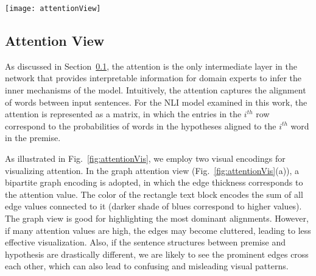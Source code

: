 \begin{figure*}[htbp]
\centering
\vspace{-2mm}
\texttt{[image: attentionView]}
\vspace{-6mm}
\caption{
Attention visualization. In the graph attention view (a), a bipartite graph encoding is adopted, in which the edge thickness corresponds to the attention value. In the matrix attention view (b), the entries of $i^{th}$ row represent the probabilities of words in hypotheses align to the $i^{th}$ word in the premise.
The user can alter the attention values via the pop-up interface illustrated in (c).
We overlay the dependency tree ($a_1$) grammar structure to highlight important words and simplify complex sentence to reduce clutter (d-e).
In (f), we show the difference between two attention matrix (the comparison feature is controlled by the buttons in the top left of all attention plots ($a_2$) ).
}
\label{fig:attentionVis}
\end{figure*}

\subsection{Attention View}
\label{sec:attention}
As discussed in Section~\ref{sec:attention}, the attention is the only intermediate layer in the network that provides interpretable information for domain experts to infer the inner mechanisms of the model.
%
Intuitively, the attention captures the alignment of words between input sentences. For the NLI model examined in this work, the attention is represented as a matrix, in which the entries in the $i^{th}$ row correspond to the probabilities of words in the hypotheses aligned to the $i^{th}$ word in the premise.

As illustrated in Fig.~\ref{fig:attentionVis}, we employ two visual encodings for visualizing attention. In the graph attention view (Fig.~\ref{fig:attentionVis}(a)), a bipartite graph encoding is adopted, in which the edge thickness corresponds to the attention value. The color of the rectangle text block encodes the sum of all edge values connected to it (darker shade of blues correspond to higher values).
%
The graph view is good for highlighting the most dominant alignments. However, if many attention values are high, the edges may become cluttered, leading to less effective visualization. Also, if the sentence structures between premise and hypothesis are drastically different, we are likely to see the prominent edges cross each other, which can also lead to confusing and misleading visual patterns.

